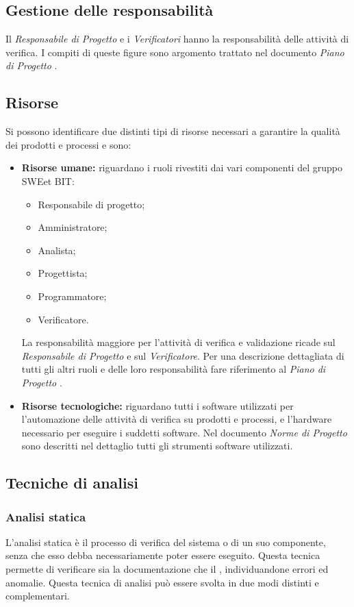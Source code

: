   \subsection{Gestione delle responsabilità}
    Il \emph{Responsabile di Progetto} e i \emph{Verificatori} hanno la responsabilità delle attività di verifica.
    I compiti di queste figure sono argomento trattato nel documento \emph{Piano di Progetto \VersionePP{}}.

  \subsection{Risorse}
    Si possono identificare due distinti tipi di risorse necessari a garantire la qualità dei prodotti e processi e sono:
    \begin{itemize}
      \item \textbf{Risorse umane:} riguardano i ruoli rivestiti dai vari componenti del gruppo SWEet BIT:
      \begin{itemize}
        \item Responsabile di progetto;
        \item Amministratore;
        \item Analista;
        \item Progettista;
        \item Programmatore;
        \item Verificatore.
      \end{itemize}

		La responsabilità maggiore per l’attività di verifica e validazione ricade sul \emph{Responsabile di Progetto} e sul \emph{Verificatore}. Per una descrizione dettagliata di tutti gli altri ruoli e delle loro responsabilità fare riferimento al \emph{Piano di Progetto \VersionePP{}}.

      \item \textbf{Risorse tecnologiche:} riguardano tutti i software utilizzati per l'automazione delle attività di verifica su prodotti e processi, e l'hardware necessario per eseguire i suddetti software. Nel documento \emph{Norme di Progetto \VersioneNP{}} sono descritti nel dettaglio tutti gli strumenti software utilizzati.
    \end{itemize}

\subsection{Tecniche di analisi}
\subsubsection{Analisi statica}
    L'analisi statica è il processo di verifica del sistema o di un suo componente, senza che esso debba necessariamente poter essere eseguito.
    Questa tecnica permette di verificare sia la documentazione che il , individuandone errori ed anomalie. Questa tecnica di analisi può essere svolta in due modi distinti e complementari.

